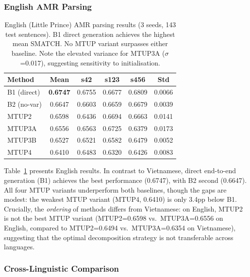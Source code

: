 \documentclass[11pt,a4paper]{article}
\begin{document}
\subsubsection{English AMR Parsing}

\begin{table}[t]
\centering
\small
\begin{tabular}{lccccc}
\toprule
\textbf{Method} & \textbf{Mean} & \textbf{s42} & \textbf{s123} & \textbf{s456} & \textbf{Std} \\
\midrule
B1 (direct)  & \textbf{0.6747} & 0.6755 & 0.6677 & 0.6809 & 0.0066 \\
B2 (no-var)  & 0.6647 & 0.6603 & 0.6659 & 0.6679 & 0.0039 \\
\midrule
MTUP2        & 0.6598 & 0.6436 & 0.6694 & 0.6663 & 0.0141 \\
MTUP3A       & 0.6556 & 0.6563 & 0.6725 & 0.6379 & 0.0173 \\
MTUP3B       & 0.6527 & 0.6521 & 0.6582 & 0.6479 & 0.0052 \\
MTUP4        & 0.6410 & 0.6483 & 0.6320 & 0.6426 & 0.0083 \\
\bottomrule
\end{tabular}
\caption{English (Little Prince) AMR parsing results (3 seeds, 143 test sentences).
B1 direct generation achieves the highest mean SMATCH. No MTUP variant
surpasses either baseline. Note the elevated variance for MTUP3A ($\sigma$=0.017),
suggesting sensitivity to initialisation.}
\label{tab:english}
\end{table}

Table~\ref{tab:english} presents English results. In contrast to Vietnamese,
direct end-to-end generation (B1) achieves the best performance (0.6747), with
B2 second (0.6647). All four MTUP variants underperform both baselines,
though the gaps are modest: the weakest MTUP variant (MTUP4, 0.6410) is only
3.4pp below B1. Crucially, the \emph{ordering} of methods differs from
Vietnamese: on English, MTUP2 is not the best MTUP variant (MTUP2=0.6598 vs.\
MTUP3A=0.6556 on English, compared to MTUP2=0.6494 vs.\ MTUP3A=0.6354 on
Vietnamese), suggesting that the optimal decomposition strategy is not
transferable across languages.

\subsubsection{Cross-Linguistic Comparison}
\end{document}
